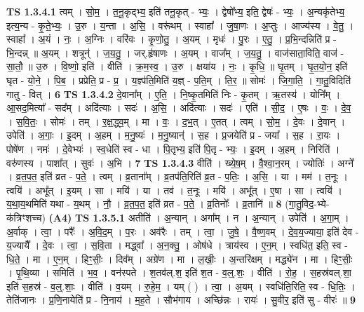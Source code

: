 \documentclass[17pt]{extarticle}
\begin{document}
                                \textbf{ TS 1.3.4.1} \newline
                  त्वम् । सो॒म॒ । त॒नू॒कृद्भ्य॒ इति॑ तनू॒कृत् - भ्यः॒ । द्वेषो᳚भ्य॒ इति॒ द्वेषः॑ - भ्यः॒ । अ॒न्यकृ॑तेभ्य॒ इत्य॒न्य - कृ॒ते॒भ्यः॒ । उ॒रु । य॒न्ता । अ॒सि॒ । वरू॑थम् । स्वाहा᳚ । जु॒षा॒णः । अ॒प्तुः । आज्य॑स्य । वे॒तु॒ । स्वाहा᳚ । अ॒यं । नः॒ । अ॒ग्निः । वरि॑वः । कृ॒णो॒तु॒ । अ॒यम् । मृधः॑ । पु॒रः । ए॒तु॒ । प्र॒भि॒न्दन्निति॑ प्र - भि॒न्दन्न् ॥ अ॒यम् । शत्रून्॑ । ज॒य॒तु॒ । जर्.हृ॑षाणः । अ॒यम् । वाज᳚म् । ज॒य॒तु॒ । वाज॑साता॒विति॒ वाज॑ - सा॒तौ॒ ॥ उ॒रु । वि॒ष्णो॒ इति॑ । वीति॑ । क्र॒म॒स्व॒ । उ॒रु । क्षया॑य । नः॒ । कृ॒धि॒ ॥ घृ॒तम् । घृ॒त॒यो॒न॒ इति॑ घृत - यो॒ने॒ । पि॒ब॒ । प्रप्रेति॒ प्र - प्र॒ । य॒ज्ञ्प॑ति॒मिति॑ य॒ज्ञ् - प॒ति॒म् । ति॒र॒ ॥ सोमः॑ । जि॒गा॒ति॒ । गा॒तु॒विदिति॑ गातु - वित् । \textbf{  6} \newline
                  \newline
                                \textbf{ TS 1.3.4.2} \newline
                  दे॒वाना᳚म् । ए॒ति॒ । नि॒ष्कृ॒तमिति॑ निः - कृ॒तम् । ऋ॒तस्य॑ । योनि᳚म् । आ॒सद॒मित्या᳚ - सद᳚म् । अदि॑त्याः । सदः॑ । अ॒सि॒ । अदि॑त्याः । सदः॑ । एति॑ । सी॒द॒ । ए॒षः । वः॒ । दे॒व॒ । स॒वि॒तः॒ । सोमः॑ । तम् । र॒क्ष॒द्ध्व॒म् । मा । वः॒ । द॒भ॒॒त् । ए॒तत् । त्वम् । सो॒म॒ । दे॒वः । दे॒वान् । उपेति॑ । अ॒गाः॒ । इ॒दम् । अ॒हम् । म॒नु॒ष्यः॑ । म॒नु॒ष्यान्॑ । स॒ह । प्र॒जयेति॑ प्र - जया᳚ । स॒ह । रा॒यः । पोषे॑ण । नमः॑ । दे॒वेभ्यः॑ । स्व॒धेति॑ स्व - धा । पि॒तृभ्य॒ इति॑ पि॒तृ - भ्यः॒ । इ॒दम् । अ॒हम् । निरिति॑ । वरु॑णस्य । पाशा᳚त् । सुवः॑ । अ॒भि । \textbf{  7} \newline
                  \newline
                                \textbf{ TS 1.3.4.3} \newline
                  वीति॑ । ख्ये॒ष॒म् । वै॒श्वा॒न॒रम् । ज्योतिः॑ । अग्ने᳚ । व्र॒त॒प॒त॒ इति॑ व्रत - प॒ते॒ । त्वम् । व्र॒ताना᳚म् । व्र॒तप॑ति॒रिति॑ व्र॒त - प॒तिः॒ । अ॒सि॒ । या । मम॑ । त॒नूः । त्वयि॑ । अभू᳚त् । इ॒यम् । सा । मयि॑ । या । तव॑ । त॒नूः । मयि॑ । अभू᳚त् । ए॒षा । सा । त्वयि॑ । य॒था॒य॒थमिति॑ यथा - य॒थम् । नौ॒ । व्र॒त॒प॒त॒ इति॑ व्रत - प॒ते॒ । व्र॒तिनोः᳚ । व्र॒तानि॑ ॥ \textbf{  8} \newline
                  \newline
                      (गा॒तु॒विद॒-भ्ये-क॑त्रिꣳशच्च)  \textbf{(A4)} \newline \newline
                                \textbf{ TS 1.3.5.1} \newline
                  अतीति॑ । अ॒न्यान् । अगा᳚म् । न । अ॒न्यान् । उपेति॑ । अ॒गा॒म् । अ॒र्वाक् । त्वा॒ । परैः᳚ । अ॒वि॒द॒म् । प॒रः । अव॑रैः । तम् । त्वा॒ । जु॒षे॒ । वै॒ष्ण॒वम् । दे॒व॒य॒ज्याया॒ इति॑ देव - य॒ज्यायै᳚ । दे॒वः । त्वा॒ । स॒वि॒ता । मद्ध्वा᳚ । अ॒न॒क्तु॒ । ओष॑धे । त्राय॑स्व । ए॒न॒म् । स्वधि॑त॒ इति॒ स्व - धि॒ते॒ । मा । ए॒न॒म् । हिꣳ॒॒सीः॒ । दिव᳚म् । अग्रे॑ण । मा । ल॒खीः॒ । अ॒न्तरि॑क्षम् । मद्ध्ये॑न । मा । हिꣳ॒॒सीः॒ । पृ॒थि॒व्या । समिति॑ । भ॒व॒ । वन॑स्पते । श॒तव॑ल्.श॒ इति॑ श॒त - व॒ल्॒.शः॒ । वीति॑ । रो॒ह॒ । स॒हस्र॑वल्.शा॒ इति॑ स॒हस्र॑ - व॒ल्॒.शाः॒ । वीति॑ । व॒यम् । रु॒हे॒म॒ । यम् ( ) । त्वा॒ । अ॒यम् । स्वधि॑ति॒रिति॒ स्व - धि॒तिः॒ । तेति॑जानः । प्र॒णि॒नायेति॑ प्र - नि॒नाय॑ । म॒ह॒ते । सौभ॑गाय । अच्छि॑न्नः । रायः॑ । सु॒वीर॒ इति॑ सु - वीरः॑ ॥ \textbf{  9 } \newline
\end{document}
